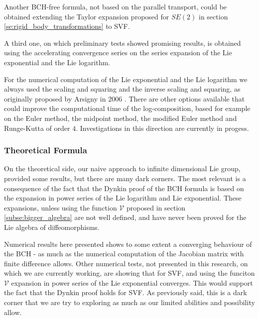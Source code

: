 Another BCH-free formula, not based on the parallel transport, could be obtained extending the Taylor expansion proposed for $SE(2)$ in section \ref{se:rigid_body_transformations} to SVF.

A third one, on which  preliminary tests showed promising results, is obtained using the accelerating convergence series \cite{cohen2000convergence} on the series expansion of the Lie exponential and the Lie logarithm. 

For the numerical computation of the Lie exponential and the Lie logarithm we always used the scaling and squaring and the inverse scaling and squaring, as originally proposed by Arsigny in $2006$ \cite{arsigny2006log}. There are other options available that could improve the computational time of the log-composition, based for example on the Euler method, the midpoint method, the modified Euler method and Runge-Kutta of order $4$. Investigations in this direction are currently in progess.


\subsubsection{Theoretical Formula}

On the theoretical side, our naive approach to infinite dimensional Lie group, provided some results, but there are many dark corners. The most relevant is a consequence of the fact that the Dynkin proof of the BCH formula is based on the expansion in power series of the Lie logarithm and Lie exponential. These expansions, unless using the function $\mathcal{V}$ proposed in section \ref{subse:bigger_algebra} are not well defined, and have never been proved for the Lie algebra of diffeomorphisms.

Numerical results here presented shows to some extent a converging behaviour of the BCH - as much as the numerical computation of the Jacobian matrix with finite difference allows.
Other numerical tests, not presented in this research, on which we are currently working, are showing that for SVF, and using the funciton $\mathcal{V}$ expansion in power series of the Lie exponential converges. This would support the fact that the Dynkin proof holds for SVF. As previously said, this is a dark corner that we are try to exploring as much as our limited abilities and possibility allow.











